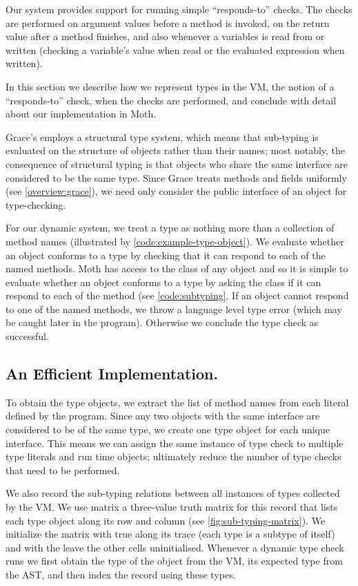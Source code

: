 
Our system provides support for running simple ``responds-to'' checks.
The checks are performed on argument values before a method is invoked,
on the return value after a method finishes, and also
whenever a variables is read from or written
(checking a variable's value when read or the evaluated expression when written).

In this section we describe
how we represent types in the VM,
the notion of a ``responds-to'' check,
when the checks are performed, 
and conclude with detail about our implementation in Moth.

Grace's employs a structural type system,
which means that sub-typing is evaluated on the structure of objects
rather than their names;
most notably,
the consequence of structural typing is that objects who share the same interface
are considered to be the same type.
Since Grace treats methods and fields uniformly (see \cref{overview:grace}), 
we need only consider the public interface of an object for type-checking.

For our dynamic system,
we treat a type as nothing more than a collection of method names
(illustrated by \cref{code:example-type-object}).
We evaluate whether an object conforms to a type
by checking that it can respond to each of the named methods.
Moth has access to the class of any object and
so it is simple to evaluate whether an object conforms to a type by
asking the class if it can respond to each of the method
(see \cref{code:subtyping}.
If an object cannot respond to one of the named methods,
we throw a language level type error
(which may be caught later in the program).
Otherwise we conclude the type check as successful.

\subsection{An Efficient Implementation.}

To obtain the type objects,
we extract the list of method names from each literal defined by the program.
Since any two objects with the same interface are considered to be of the same type,
we create one type object for each unique interface. 
This means we can assign the same instance of type check to multiple type literals
and run time objects;
ultimately reduce the number of type checks that need to be performed.

We also record the sub-typing relations between all instances of types collected by the VM.
We use matrix a three-value truth matrix for this record that 
lists each type object along its row and column (see \cref{fig:sub-typing-matrix}).
We initialize the matrix with true along its trace (each type is a subtype of itself) and 
with the leave the other cells uninitialised.
Whenever a dynamic type check runs we first obtain the type of the object from the VM, 
its expected type from the AST,
and then index the record using these types.

